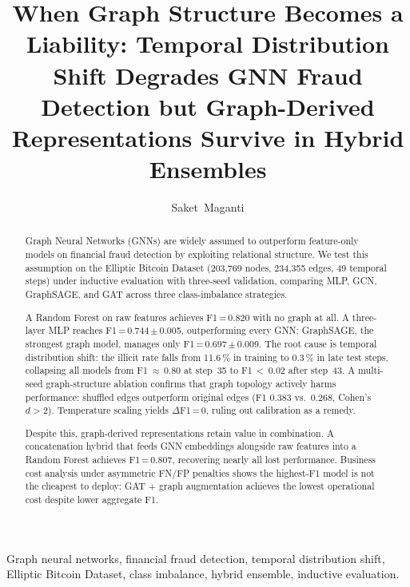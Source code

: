 \documentclass[journal,10pt,twoside]{IEEEtran}
\begin{document}
\title{When Graph Structure Becomes a Liability: Temporal Distribution
Shift Degrades GNN Fraud Detection but Graph-Derived Representations
Survive in Hybrid Ensembles}

\author{Saket~Maganti}


\maketitle

\begin{abstract}
Graph Neural Networks (GNNs) are widely assumed to outperform
feature-only models on financial fraud detection by exploiting
relational structure. We test this assumption on the Elliptic Bitcoin
Dataset (203,769 nodes, 234,355 edges, 49 temporal steps) under
inductive evaluation with three-seed validation, comparing MLP, GCN,
GraphSAGE, and GAT across three class-imbalance strategies.

A Random Forest on raw features achieves F1\,=\,0.820 with no graph
at all. A three-layer MLP reaches F1\,=\,0.744\,$\pm$\,0.005,
outperforming every GNN; GraphSAGE, the strongest graph model, manages
only F1\,=\,0.697\,$\pm$\,0.009. The root cause is temporal
distribution shift: the illicit rate falls from 11.6\,\% in training
to 0.3\,\% in late test steps, collapsing all models from
F1\,$\approx$\,0.80 at step~35 to F1\,$<$\,0.02 after step~43.
A multi-seed graph-structure ablation confirms that graph topology
actively harms performance: shuffled edges outperform original edges
(F1 0.383 vs.\ 0.268, Cohen's $d > 2$). Temperature scaling yields
$\Delta$F1\,=\,0, ruling out calibration as a remedy.

Despite this, graph-derived representations retain value in
combination. A concatenation hybrid that feeds GNN embeddings
alongside raw features into a Random Forest achieves F1\,=\,0.807,
recovering nearly all lost performance. Business cost analysis under
asymmetric FN/FP penalties shows the highest-F1 model is not the
cheapest to deploy: GAT + graph augmentation achieves the lowest
operational cost despite lower aggregate F1.
\end{abstract}

\begin{IEEEkeywords}
Graph neural networks, financial fraud detection, temporal distribution
shift, Elliptic Bitcoin Dataset, class imbalance, hybrid ensemble,
inductive evaluation.
\end{IEEEkeywords}
\end{document}
